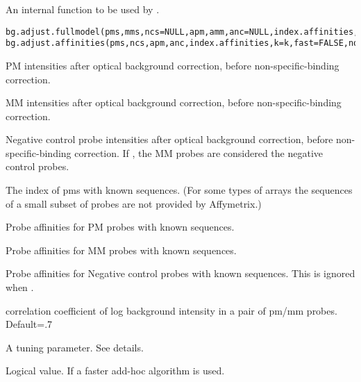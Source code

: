 \begin{Description}\relax
An internal function to be used by .
\end{Description}
\begin{Usage}
\begin{verbatim}
bg.adjust.fullmodel(pms,mms,ncs=NULL,apm,amm,anc=NULL,index.affinities,k=k,rho=.7,fast)
bg.adjust.affinities(pms,ncs,apm,anc,index.affinities,k=k,fast=FALSE,nomm=FALSE)
\end{verbatim}
\end{Usage}
\begin{Arguments}
\begin{ldescription}
\item[\code{pms}] PM intensities after optical background correction, before
non-specific-binding correction.
\item[\code{mms}] MM intensities after optical background correction, before
non-specific-binding correction.
\item[\code{ncs}] Negative control probe intensities after optical background correction, before
non-specific-binding correction. If , the MM probes
are considered the negative control probes.
\item[\code{index.affinities}] The index of pms with known sequences. (For some types of
arrays the sequences of a small subset of probes are not provided by
Affymetrix.)
\item[\code{apm}] Probe affinities for PM probes with known sequences.
\item[\code{amm}] Probe affinities for MM probes with known sequences.
\item[\code{anc}] Probe affinities for Negative control probes with known
sequences. This is ignored when .
\item[\code{rho}] correlation coefficient of log background intensity in a pair of pm/mm probes. Default=.7
\item[\code{k}] A tuning parameter. See details.
\item[\code{fast}] Logical value. If  a faster add-hoc algorithm is used.
\item[\code{nomm}] 
\end{ldescription}
\end{Arguments}
